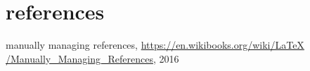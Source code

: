 \chapter{references}

\begin{thebibliography}{1}
		manually managing references, 
		\url{https://en.wikibooks.org/wiki/LaTeX /Manually_Managing_References},
		2016
\end{thebibliography}
